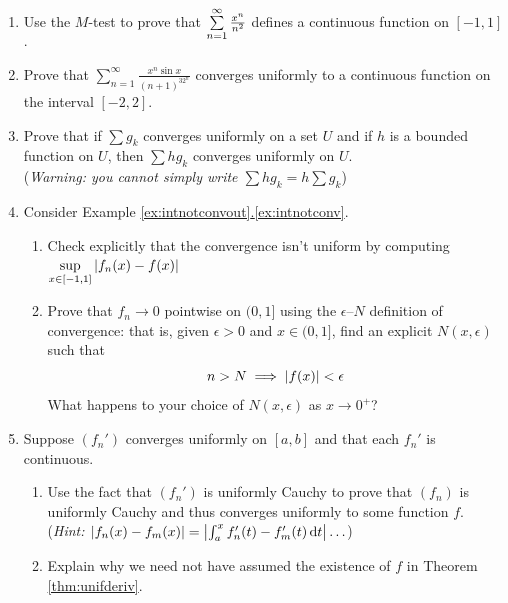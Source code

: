 \begin{exercises}
\begin{enumerate}
		
	
		
		\item Use the $M$-test to prove that $\smash[b]{\sum\limits_{n=1}^\infty\frac{x^n}{n^2}}$ defines a continuous function on $[-1,1]$.
	  
	  \item Prove that $\sum\limits_{n=1}^\infty\frac{x^n\sin x}{(n+1)^32^n}$ converges uniformly to a continuous function on the interval $[-2,2]$.
	
	 \item Prove that if $\sum g_k$ converges uniformly on a set $U$ and if $h$ is a bounded function on $U$, then $\sum hg_k$ converges uniformly on $U$.\\
	 (\emph{Warning: you cannot simply write $\sum hg_k=h\sum g_k$})
	
	
		\item Consider Example \hyperref[ex:intnotconv]{\ref*{ex:intnotconvout}.\ref*{ex:intnotconv}}.
		\begin{enumerate}
		  \item Check explicitly that the convergence isn't uniform by computing $\sup\limits_{x\in[-1,1]}\left| f_n(x)-f(x)\right|$
		  \item Prove that $f_n\to 0$ pointwise on $(0,1]$ using the $\epsilon$--$N$ definition of convergence: that is, given $\epsilon>0$ and $x\in(0,1]$, find an explicit $N(x,\epsilon)$ such that
	  	\[n>N\implies \left| f(x)\right|<\epsilon\]
	  	What happens to your choice of $N(x,\epsilon)$ as $x\to 0^+$?
		\end{enumerate}
		
		\item\label{ex:derivunifconvtidy} Suppose $(f_n')$ converges uniformly on $[a,b]$ and that each $f_n'$ is continuous.
		\begin{enumerate}
		  \item Use the fact that $(f_n')$ is uniformly Cauchy to prove that $(f_n)$ is uniformly Cauchy and thus converges uniformly to some function $f$.\\
			(\emph{Hint: $\left| f_n(x)-f_m(x)\right|=\left| \int_a^xf_n'(t)-f_m'(t)\,{\mathrm{d} t}\right|\ldots$})
			\item Explain why we need not have assumed the existence of $f$ in Theorem \ref{thm:unifderiv}.
		\end{enumerate}
	\end{enumerate}
\end{exercises}


